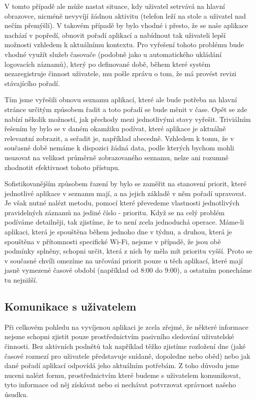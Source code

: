 \documentclass[thesis=M,czech]{FITthesis}[2012/06/26]
\begin{document}
V tomto případě ale může nastat situace, kdy uživatel setrvává na hlavní obrazovce, nicméně nevyvíjí žádnou aktivitu (telefon leží na stole a uživatel nad nečím přemýšlí). V takovém případě by bylo vhodné i přesto, že se naše aplikace nachází v popředí, obnovit pořadí aplikací a nabídnout tak uživateli lepší možnosti vzhledem k aktuálnímu kontextu. Pro vyřešení tohoto problému bude vhodné využít služeb časovače (podobně jako u automatického ukládání logovacích záznamů), který po definované době, během které systém nezaregistruje činnost uživatele, mu pošle zprávu o tom, že má provést revizi stávajícího pořadí.

Tím jsme vyřešili obnovu seznamu aplikací, které ale bude potřeba na hlavní stránce určitým způsobem řadit a toto pořadí se bude měnit v čase. Opět se zde nabízí několik možností, jak přechody mezi jednotlivými stavy vyřešit. Triviálním řešením by bylo se v daném okamžiku podívat, které aplikace je aktuálně relevantní zobrazit, a seřadit je, například abecedně. Vzhledem k tomu, že v současné době nemáme k dispozici žádná data, podle kterých bychom mohli usuzovat na velikost průměrně zobrazovaného seznamu, nelze ani rozumně zhodnotit efektivnost tohoto přístupu.

Sofistikovanějším způsobem řazení by bylo se zaměřit na stanovení priorit, které jednotlivé aplikace v seznamu mají, a na jejich základě v něm pořadí upravovat. Je však nutné nalézt metodu, pomocí které převedeme vlastnosti jednotlivých pravidelných záznamů na jediné číslo - prioritu. Když se na celý problém podíváme detailněji, tak zjistíme, že to není zcela jednoduchá operace. Máme-li aplikaci, která je spouštěna během jednoho dne v týdnu, a druhou, která je spouštěna v přítomnosti specifické Wi-Fi, nejsme v případě, že jsou obě podmínky splněny, schopni určit, která z nich by měla mít prioritu vyšší. Proto se v současné chvíli omezíme na určování priorit pouze u těch aplikací, které mají jasně vymezené časové období (například od 8:00 do 9:00), a ostatním ponecháme tu nejnižší.

\subsection{Komunikace s uživatelem}\label{communication}
Při celkovém pohledu na vyvíjenou aplikaci je zcela zřejmé, že některé informace nejsme schopni zjistit pouze prostřednictvím pasivního sledování uživatelské činnosti. Bez aktivních podnětů tak například těžko zjistíme rozložení dne (jaké časové rozmezí pro uživatele představuje snídaně, dopoledne nebo oběd) nebo jak dané pořadí aplikací odpovídá jeho aktuálním potřebám. Z toho důvodu jsme nuceni nalézt formu, prostřednictvím které budeme s uživatelem komunikovat, tyto informace od něj získávat nebo si nechávat potvrzovat správnost našeho úsudku.
\end{document}
